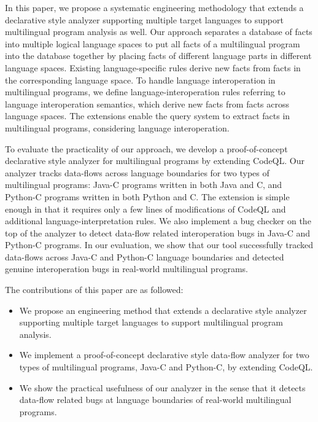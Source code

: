 In this paper, we propose a systematic engineering methodology that extends a
declarative style analyzer supporting multiple target languages to support
multilingual program analysis as well. Our approach separates a database of
facts into multiple logical language spaces to put all facts of a multilingual
program into the database together by placing facts of different language parts
in different language spaces. Existing language-specific rules derive new facts
from facts in the corresponding language space. To handle language
interoperation in multilingual programs, we define language-interoperation
rules referring to language interoperation semantics, which derive new facts
from facts across language spaces. The extensions enable the query system to
extract facts in multilingual programs, considering language interoperation.

To evaluate the practicality of our approach, we develop a proof-of-concept
declarative style analyzer for multilingual programs by extending CodeQL. Our
analyzer tracks data-flows across language boundaries for two types of
multilingual programs: Java-C programs written in both Java and C, and Python-C
programs written in both Python and C. The extension is simple enough in that
it requires only a few lines of modifications of CodeQL and additional
language-interpretation rules. We also implement a bug checker on the top of
the analyzer to detect data-flow related interoperation bugs in Java-C and
Python-C programs. In our evaluation, we show that our tool successfully
tracked data-flows across Java-C and Python-C language boundaries and detected
genuine interoperation bugs in real-world multilingual programs.

The contributions of this paper are as followed:
\begin{itemize}
\item We propose an engineering method that extends a declarative style analyzer
supporting multiple target languages to support multilingual program analysis.

\item We implement a proof-of-concept declarative style data-flow analyzer for two
types of multilingual programs, Java-C and Python-C, by extending CodeQL.

\item We show the practical usefulness of our analyzer in the sense that it detects
data-flow related bugs at language boundaries of real-world multilingual
programs.
\end{itemize}
